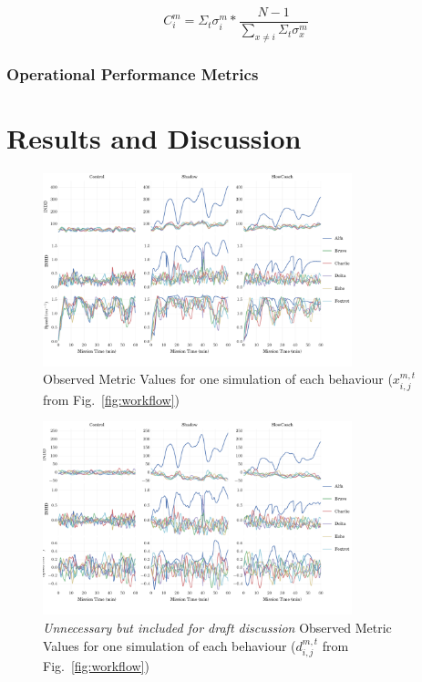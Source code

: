 \documentclass[conference]{IEEEtran}
\begin{document}
\begin{equation}
  C_{i}^{m} = \Sigma_t\sigma_{i}^m * \frac{N-1}{\sum_{x\neq i}{\Sigma_t\sigma_{x}^m}}\label{eq:confidence}
\end{equation}


\subsubsection{Operational Performance Metrics}

\section{Results and Discussion}
\begin{figure}
  \centering
  \includegraphics[width=0.8\textwidth]{Metric_Values}
  \caption{Observed Metric Values for one simulation of each behaviour ($x_{i,j}^{m,t}$ from Fig.~\ref{fig:workflow})}
\end{figure}

\begin{figure}
  \centering
  \includegraphics[width=0.8\textwidth]{Metric_Deviation}
  \caption{\emph{Unnecessary but included for draft discussion} Observed Metric Values for one simulation of each behaviour ($d_{i,j}^{m,t}$ from Fig.~\ref{fig:workflow})}
\end{figure}
\end{document}

